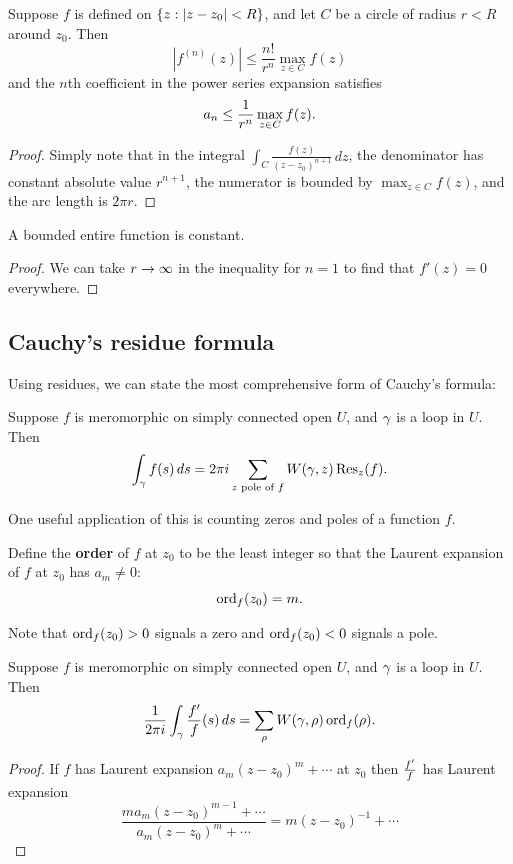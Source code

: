\begin{cor}
Suppose $f$ is defined on $\left\{{z}:{|z-z_0|<R}\right\}$, and let $C$ be a circle of radius $r<R$ around $z_0$. Then 
\[
|f^{(n)}(z)|\le \frac{n!}{r^n} \max_{z\in C} f(z)
\]
and the $n$th coefficient in the power series expansion satisfies
\[
a_n\le \frac{1}{r^n}\max_{z\in C} f(z).
\]
\end{cor}
\begin{proof}
Simply note that in the integral $\int_{C} \frac{f(z)}{(z-z_0)^{n+1}}\,dz$, the denominator has constant absolute value $r^{n+1}$, the numerator is bounded by $\max_{z\in C} f(z)$, and the arc length is $2\pi r$.
\end{proof}
\begin{cor}[Liouville]
A bounded entire function is constant.
\end{cor}
\begin{proof}
We can take $r\to \infty$ in the inequality for $n=1$ to find that $f'(z)=0$ everywhere.
\end{proof}

\subsection{Cauchy's residue formula}
Using residues, we can state the most comprehensive form of Cauchy's formula:
\begin{thm}
Suppose $f$ is meromorphic on simply connected open $U$, and $\gamma$ is a loop in $U$. Then
\[
\int_{\gamma} f(s)\,ds =2\pi i \sum_{z\text{ pole of }f}W(\gamma,z)\operatorname{Res}_{z}(f).
\]
\end{thm}
One useful application of this is counting zeros and poles of a function $f$.
\begin{df}
Define the \textbf{order} of $f$ at $z_0$ to be the least integer so that the Laurent expansion of $f$ at $z_0$ has $a_m\ne 0$:
\[
\operatorname{ord}_f(z_0)=m.
\]
\end{df}
Note that $\operatorname{ord}_f(z_0)>0$ signals a zero and $\operatorname{ord}_f(z_0)<0$ signals a pole.
\begin{cor}
Suppose $f$ is meromorphic on simply connected open $U$, and $\gamma$ is a loop in $U$. Then
\[
\frac{1}{2\pi i}\int_{\gamma}\frac{f'}{f}(s)\,ds =\sum_{\rho}W(\gamma,\rho)\operatorname{ord}_f(\rho).
\]
\end{cor}
\begin{proof}
If $f$ has Laurent expansion $a_{m}(z-z_0)^m+\cdots $ at $z_0$ then $\frac{f'}{f}$ has Laurent expansion
\[
\frac{ma_m(z-z_0)^{m-1}+\cdots}{a_m(z-z_0)^m+\cdots }= m(z-z_0)^{-1}+\cdots
\]
\end{proof}
